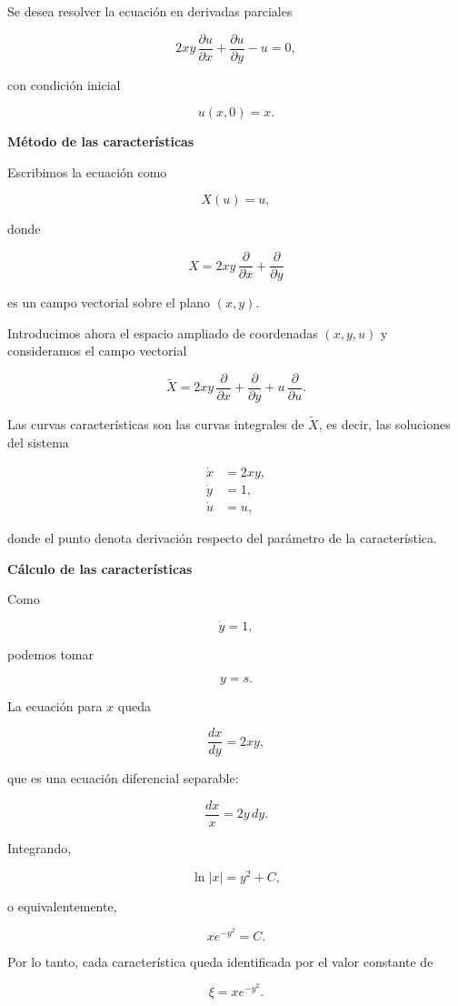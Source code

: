 \documentclass[11pt,spanish]{article}
\begin{document}
Se desea resolver la ecuación en derivadas parciales

\[
2xy\,\frac{\partial u}{\partial x}
+\frac{\partial u}{\partial y}
-u=0,
\]

con condición inicial

\[
u(x,0)=x.
\]

{\bf Método de las características}

Escribimos la ecuación como

\[
X(u)=u,
\]

donde

\[
X
=
2xy\,\frac{\partial}{\partial x}
+
\frac{\partial}{\partial y}
\]

es un campo vectorial sobre el plano $(x,y)$.

Introducimos ahora el espacio ampliado de coordenadas $(x,y,u)$ y consideramos el
campo vectorial

\[
\widetilde X
=
2xy\,\frac{\partial}{\partial x}
+
\frac{\partial}{\partial y}
+
u\,\frac{\partial}{\partial u}.
\]

Las curvas características son las curvas integrales de $\widetilde X$, es decir,
las soluciones del sistema

\[
\boxed{
\begin{aligned}
\dot x &=2xy,\\
\dot y &=1,\\
\dot u &=u,
\end{aligned}
}
\]

donde el punto denota derivación respecto del parámetro de la característica.

{\bf Cálculo de las características}

Como

\[
\dot y=1,
\]

podemos tomar

\[
y=s.
\]

La ecuación para $x$ queda

\[
\frac{dx}{dy}=2xy,
\]

que es una ecuación diferencial separable:

\[
\frac{dx}{x}=2y\,dy.
\]

Integrando,

\[
\ln|x|=y^2+C,
\]

o equivalentemente,

\[
\boxed{
xe^{-y^2}=C.
}
\]

Por lo tanto, cada característica queda identificada por el valor constante de

\[
\xi=xe^{-y^2}.
\]
\end{document}
